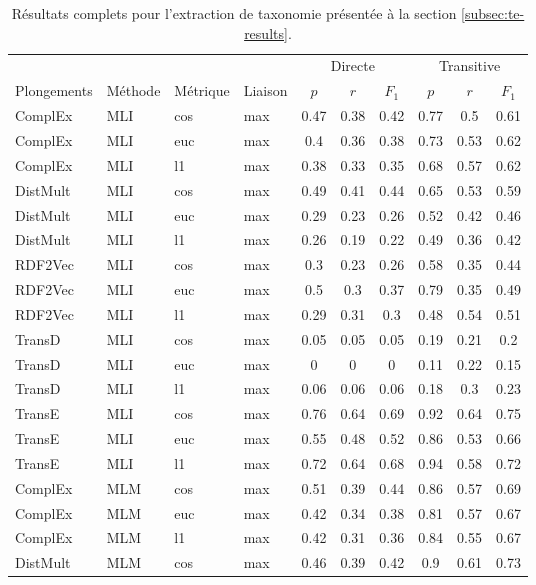 \begin{longtable}{|llll|ccc|ccc|}
    \caption{Résultats complets pour l'extraction de taxonomie présentée à la section \ref{subsec:te-results}.}
    \label{tab:te-full-results} \\
    \hline 
	&		&		&		&	\multicolumn{3}{c|}{Directe} & \multicolumn{3}{c|}{Transitive}   \\
Plongements	&	Méthode	&	Métrique	&	Liaison	&	$p$	&	$r$	&	$F_1$	&	$p$	&	$r$	&	$F_1$	\\
\hline \endhead
\hline \endfoot
ComplEx	&	MLI	&	cos	&	max	&	0.47	&	0.38	&	0.42	&	0.77	&	0.5	&	0.61 \\ 
ComplEx	&	MLI	&	euc	&	max	&	0.4	&	0.36	&	0.38	&	0.73	&	0.53	&	0.62 \\ 
ComplEx	&	MLI	&	l1	&	max	&	0.38	&	0.33	&	0.35	&	0.68	&	0.57	&	0.62 \\ 
DistMult	&	MLI	&	cos	&	max	&	0.49	&	0.41	&	0.44	&	0.65	&	0.53	&	0.59 \\ 
DistMult	&	MLI	&	euc	&	max	&	0.29	&	0.23	&	0.26	&	0.52	&	0.42	&	0.46 \\ 
DistMult	&	MLI	&	l1	&	max	&	0.26	&	0.19	&	0.22	&	0.49	&	0.36	&	0.42 \\ 
RDF2Vec	&	MLI	&	cos	&	max	&	0.3	&	0.23	&	0.26	&	0.58	&	0.35	&	0.44 \\ 
RDF2Vec	&	MLI	&	euc	&	max	&	0.5	&	0.3	&	0.37	&	0.79	&	0.35	&	0.49 \\ 
RDF2Vec	&	MLI	&	l1	&	max	&	0.29	&	0.31	&	0.3	&	0.48	&	0.54	&	0.51 \\ 
TransD	&	MLI	&	cos	&	max	&	0.05	&	0.05	&	0.05	&	0.19	&	0.21	&	0.2 \\ 
TransD	&	MLI	&	euc	&	max	&	0	&	0	&	0	&	0.11	&	0.22	&	0.15 \\ 
TransD	&	MLI	&	l1	&	max	&	0.06	&	0.06	&	0.06	&	0.18	&	0.3	&	0.23 \\ 
TransE	&	MLI	&	cos	&	max	&	0.76	&	0.64	&	0.69	&	0.92	&	0.64	&	0.75 \\ 
TransE	&	MLI	&	euc	&	max	&	0.55	&	0.48	&	0.52	&	0.86	&	0.53	&	0.66 \\ 
TransE	&	MLI	&	l1	&	max	&	0.72	&	0.64	&	0.68	&	0.94	&	0.58	&	0.72 \\ 
ComplEx	&	MLM	&	cos	&	max	&	0.51	&	0.39	&	0.44	&	0.86	&	0.57	&	0.69 \\ 
ComplEx	&	MLM	&	euc	&	max	&	0.42	&	0.34	&	0.38	&	0.81	&	0.57	&	0.67 \\ 
ComplEx	&	MLM	&	l1	&	max	&	0.42	&	0.31	&	0.36	&	0.84	&	0.55	&	0.67 \\ 
DistMult	&	MLM	&	cos	&	max	&	0.46	&	0.39	&	0.42	&	0.9	&	0.61	&	0.73 \\ 

\end{longtable}
